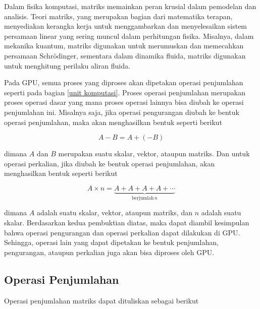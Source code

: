 Dalam fisika komputasi, matriks memainkan peran krusial dalam pemodelan dan
analisis. Teori matriks, yang merupakan bagian dari matematika terapan,
menyediakan kerangka kerja untuk menggambarkan dan menyelesaikan sistem
persamaan linear yang sering muncul dalam perhitungan fisika. Misalnya, dalam
mekanika kuantum, matriks digunakan untuk merumuskan dan memecahkan persamaan
Schrödinger, sementara dalam dinamika fluida, matriks digunakan untuk
menghitung perilaku aliran fluida.

Pada GPU, semua proses yang diproses akan dipetakan operasi penjumlahan seperti
pada bagian \ref{unit komputasi}. Proses operasi penjumlahan merupakan proses
operasi dasar yang mana proses operasi lainnya bisa diubah ke operasi
penjumlahan ini. Misalnya saja, jika operasi pengurangan diubah ke bentuk
operasi penjumlahan, maka akan menghasilkan bentuk seperti berikut

\[
  A - B = A + (-B)
\]

\noindent
dimana $A$ dan $B$ merupakan suatu skalar, vektor, ataupun matriks. Dan untuk operasi
perkalian, jika diubah ke bentuk operasi penjumlahan, akan menghasilkan bentuk seperti
berikut

\[
  A \times n = \underbrace{A + A + A + A + \cdots}_{\text{berjumlah}\, n}
\]

\noindent
dimana $A$ adalah suatu skalar, vektor, ataupun matriks, dan $n$ adalah suatu
skalar. Berdasarkan kedua pembuktian diatas, maka dapat diambil kesimpulan bahwa
operasi pengurangan dan operasi perkalian dapat dilakukan di GPU. Sehingga,
operasi lain yang dapat dipetakan ke bentuk penjumlahan, pengurangan, ataupun
perkalian juga akan bisa diproses oleh GPU.

\subsection{Operasi Penjumlahan}

Operasi penjumlahan matriks dapat dituliskan sebagai berikut

